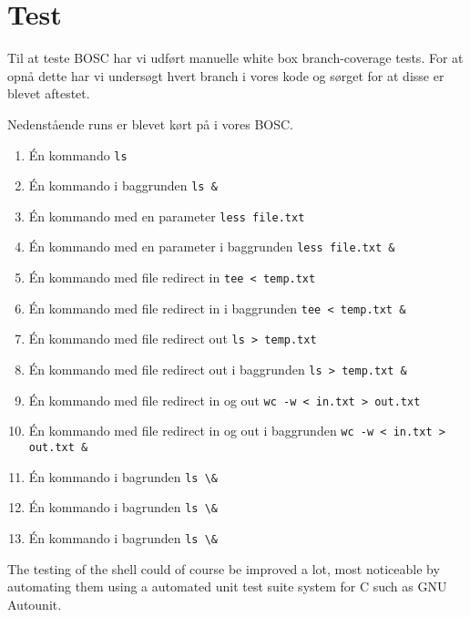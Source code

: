 \section{Test}
Til at teste BOSC har vi udført manuelle white box branch-coverage tests. For at opnå dette har vi undersøgt hvert branch i vores kode og sørget for at disse er blevet aftestet.

Nedenstående runs er blevet kørt på i vores BOSC.

\begin{enumerate}
	\item Én kommando
	\verb+ls+
	\item Én kommando i baggrunden
	\verb+ls &+
	\item Én kommando med en parameter
	\verb+less file.txt+
	\item Én kommando med en parameter i baggrunden
	\verb+less file.txt &+
	\item Én kommando med file redirect in
	\verb+tee < temp.txt+
	\item Én kommando med file redirect in i baggrunden
	\verb+tee < temp.txt &+
	\item Én kommando med file redirect out
	\verb+ls > temp.txt+
	\item Én kommando med file redirect out i baggrunden
	\verb+ls > temp.txt &+
	\item Én kommando med file redirect in og out
	\verb+wc -w < in.txt > out.txt+
	\item Én kommando med file redirect in og out i baggrunden
	\verb+wc -w < in.txt > out.txt &+
	\item Én kommando i bagrunden
	\verb+ls \&+
	\item Én kommando i bagrunden
	\verb+ls \&+
	\item  Én kommando i bagrunden
	\verb+ls \&+
\end{enumerate}

The testing of the shell could of course be improved a lot, most noticeable by automating them using a automated unit test suite system for C such as GNU Autounit. 
